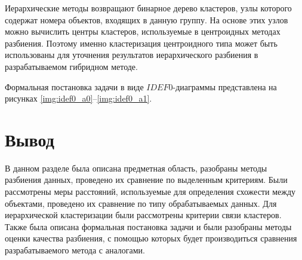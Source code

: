 Иерархические методы возвращают бинарное дерево кластеров, узлы которого содержат номера объектов, входящих в данную группу. На основе этих узлов можно вычислить центры кластеров, используемые в центроидных методах разбиения.
Поэтому именно кластеризация центроидного типа может быть использованы для уточнения результатов иерархического разбиения в разрабатываемом гибридном методе.

Формальная постановка задачи в виде $IDEF0$-диаграммы представлена на рисунках \ref{img:idef0_a0}--\ref{img:idef0_a1}.
\clearpage

\section*{Вывод}

В данном разделе была описана предметная область, разобраны методы разбиения данных, проведено их сравнение по выделенным критериям. Были рассмотрены меры расстояний, используемые для определения схожести между объектами, проведено их сравнение по типу обрабатываемых данных. Для иерархической кластеризации были рассмотрены критерии связи кластеров. Также была описана формальная постановка задачи и были разобраны методы оценки качества разбиения, с помощью которых будет производиться сравнения разрабатываемого метода с аналогами.
